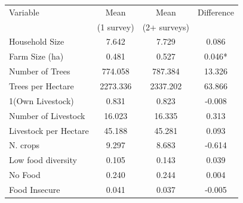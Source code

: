 \begin{tabular}{lccc}
\hline
Variable & Mean & Mean & Difference  \\
& (1 survey) & (2+ surveys)  \\
\hline
Household Size & 7.642 & 7.729 & 0.086 \\
Farm Size (ha) & 0.481 & 0.527 & 0.046* \\
Number of Trees & 774.058 & 787.384 & 13.326 \\
Trees per Hectare & 2273.336 & 2337.202 & 63.866 \\
1(Own Livestock) & 0.831 & 0.823 & -0.008 \\
Number of Livestock & 16.023 & 16.335 & 0.313 \\
Livestock per Hectare & 45.188 & 45.281 & 0.093 \\
N. crops & 9.297 & 8.683 & -0.614 \\
Low food diversity & 0.105 & 0.143 & 0.039 \\
No Food & 0.240 & 0.244 & 0.004 \\
Food Insecure & 0.041 & 0.037 & -0.005 \\
\hline
\end{tabular}
